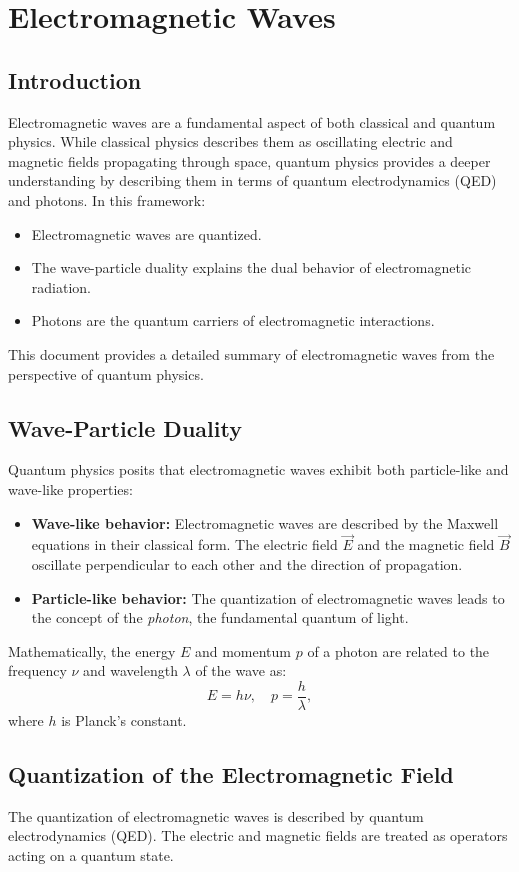 \section{Electromagnetic Waves}
\subsection{Introduction}
Electromagnetic waves are a fundamental aspect of both classical and quantum physics. While classical physics describes them as oscillating electric and magnetic fields propagating through space, quantum physics provides a deeper understanding by describing them in terms of quantum electrodynamics (QED) and photons. In this framework:
\begin{itemize}
    \item Electromagnetic waves are quantized.
    \item The wave-particle duality explains the dual behavior of electromagnetic radiation.
    \item Photons are the quantum carriers of electromagnetic interactions.
\end{itemize}

This document provides a detailed summary of electromagnetic waves from the perspective of quantum physics.

\subsection{Wave-Particle Duality}
Quantum physics posits that electromagnetic waves exhibit both particle-like and wave-like properties:
\begin{itemize}
    \item \textbf{Wave-like behavior:} Electromagnetic waves are described by the Maxwell equations in their classical form. The electric field $\vec{E}$ and the magnetic field $\vec{B}$ oscillate perpendicular to each other and the direction of propagation.
    \item \textbf{Particle-like behavior:} The quantization of electromagnetic waves leads to the concept of the \textit{photon}, the fundamental quantum of light.
\end{itemize}

Mathematically, the energy $E$ and momentum $p$ of a photon are related to the frequency $\nu$ and wavelength $\lambda$ of the wave as:
\[
E = h \nu, \quad p = \frac{h}{\lambda},
\]
where $h$ is Planck's constant.

\subsection*{Quantization of the Electromagnetic Field}
The quantization of electromagnetic waves is described by quantum electrodynamics (QED). The electric and magnetic fields are treated as operators acting on a quantum state.

